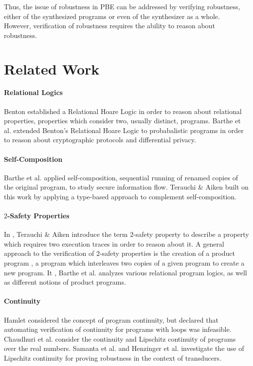\documentclass{llncs}
\begin{document}
Thus, the issue of robustness in PBE can be addressed by verifying robustness, either of the synthesized programs or even of the synthesizer as a whole.  However, verification of robustness requires the ability to reason about robustness.

\section{Related Work}

\paragraph{Relational Logics} Benton \cite{benton} established a Relational Hoare Logic in order to reason about relational properties, properties which consider two, usually distinct, programs.  Barthe et al. \cite{barthecrypto,bartheprivacy} extended Benton's Relational Hoare Logic to probabalistic programs in order to reason about cryptographic protocols and differential privacy.

\paragraph{Self-Composition} Barthe et al. \cite{barthecomposition} applied self-composition, sequential running of renamed copies of the original program, to study secure information flow.  Terauchi \& Aiken \cite{terauchi05} built on this work by applying a type-based approach to complement self-composition.

\paragraph{\(2\)-Safety Properties} In \cite{terauchi05}, Terauchi \& Aiken introduce the term \(2\)-safety property to describe a property which requires two execution traces in order to reason about it.  A general approach to the verification of \(2\)-safety properties is the creation of a product program \cite{bartheproduct}, a program which interleaves two copies of a given program to create a new program.  It \cite{bartheanalysis}, Barthe et al. analyzes various relational program logics, as well as different notions of product programs.

\paragraph{Continuity} Hamlet \cite{hamlet02} considered the concept of program continuity, but declared that automating verification of continuity for programs with loops was infeasible.  Chaudhuri et al. \cite{chaudhuri10,chaudhuri11} consider the continuity and Lipschitz continuity of programs over the real numbers. Samanta et al. \cite{samanta13} and Henzinger et al. \cite{samanta14} investigate the use of Lipschitz continuity for proving robustness in the context of transducers.
\end{document}
